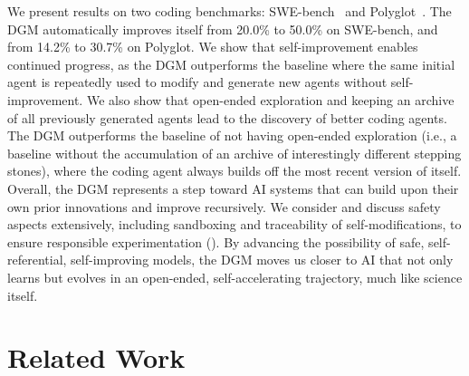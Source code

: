 \documentclass{article}
\begin{document}
We present results on two coding benchmarks: SWE-bench~\citep{jimenez2024swebench} and Polyglot~\citep{gauthier2024polyglot}. The DGM automatically improves itself from 20.0\% to 50.0\% on SWE-bench, and from 14.2\% to 30.7\% on Polyglot. We show that self-improvement enables continued progress, as the DGM outperforms the baseline where the same initial agent is repeatedly used to modify and generate new agents without self-improvement. We also show that open-ended exploration and keeping an archive of all previously generated agents lead to the discovery of better coding agents. The DGM outperforms the baseline of not having open-ended exploration (i.e., a baseline without the accumulation of an archive of interestingly different stepping stones), where the coding agent always builds off the most recent version of itself. Overall, the DGM represents a step toward AI systems that can build upon their own prior innovations and improve recursively. We consider and discuss safety aspects extensively, including sandboxing and traceability of self-modifications, to ensure responsible experimentation (). By advancing the possibility of safe, self-referential, self-improving models, the DGM moves us closer to AI that not only learns but evolves in an open-ended, self-accelerating trajectory, much like science itself.

\section{Related Work}
\label{sec:related}
\end{document}
